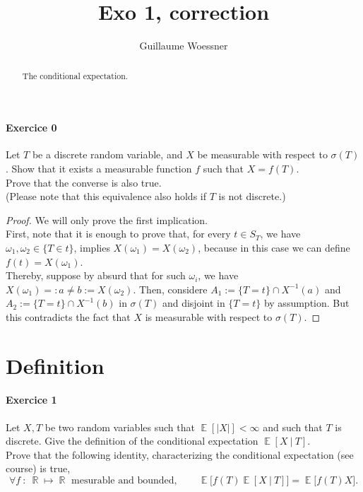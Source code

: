 \documentclass[10pt,a4paper]{article}
\title{Exo 1, correction}
\author{Guillaume Woessner}
\date{}                       %
\theoremstyle{definition}
\numberwithin{equation}{section}
\DeclareMathOperator{\R}{\mathbb{R}}
\DeclareMathOperator{\E}{\mathbb{E}}
\begin{document}
\maketitle                    %

\begin{abstract}
\begin{center}
The conditional expectation.
\end{center}
\end{abstract}


\paragraph{Exercice 0}
Let $T$ be a discrete random variable, and $X$ be measurable with respect to $\sigma(T)$. Show that it exists a measurable function $f$ such that $X=f(T)$.\\
Prove that the converse is also true.\\
(Please note that this equivalence also holds if $T$ is not discrete.)

\begin{proof}
We will only prove the first implication.\\
First, note that it is enough to prove that, for every $t\in S_T$, we have $\omega_1,\omega_2\in\{T\in t\}$, implies $X(\omega_1)=X(\omega_2)$, because in this case we can define $f(t)=X(\omega_1)$.\\
Thereby, suppose by absurd that for such $\omega_i$, we have $X(\omega_1)=:a\neq b:= X(\omega_2)$. Then, considere $A_1:=\{T=t\}\cap X^{-1}(a)$ and $A_2:=\{T=t\}\cap X^{-1}(b)$ in $\sigma(T)$ and disjoint in $\{T=t\}$ by assumption. But this contradicts the fact that $X$ is measurable with respect to $\sigma(T)$.
\end{proof}

\section{Definition}

\paragraph{Exercice 1}
Let $X,T$ be two random variables such that $\E[|X|]<\infty$ and such that $T$ is discrete. Give the definition of the conditional expectation $\E[X~|~T]$.\\
Prove that the following identity, characterizing the conditional expectation (see course) is true,
$$\forall f~:~\R\mapsto\R \text{ mesurable and bounded},\qquad \E\big[ f(T) \E[X~|~T]\big] = \E\big[ f(T) X\big].$$
\end{document}
